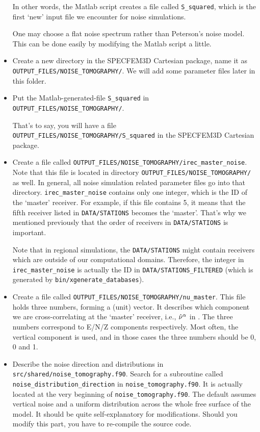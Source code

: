 \begin{itemize}
In other words, the Matlab script creates a file called \texttt{S\_squared},
which is the first `new' input file we encounter for noise simulations.


One may choose a flat noise spectrum rather than Peterson's noise
model. This can be done easily by modifying the Matlab script a little.

\item Create a new directory in the SPECFEM3D Cartesian package, name it
as \texttt{OUTPUT\_FILES/NOISE\_TOMOGRAPHY/}. We will add some parameter
files later in this folder.
\item Put the Matlab-generated-file \texttt{S\_squared} in \texttt{OUTPUT\_FILES/NOISE\_TOMOGRAPHY/}.


That's to say, you will have a file \texttt{OUTPUT\_FILES/NOISE\_TOMOGRAPHY/S\_squared}
in the SPECFEM3D Cartesian package.

\item Create a file called \texttt{OUTPUT\_FILES/NOISE\_TOMOGRAPHY/irec\_master\_noise}.
Note that this file is located in directory \texttt{OUTPUT\_FILES/NOISE\_TOMOGRAPHY/}
as well. In general, all noise simulation related parameter files
go into that directory. \texttt{irec\_master\_noise} contains only
one integer, which is the ID of the `master' receiver. For example,
if this file contains 5, it means that the fifth receiver listed in
\texttt{DATA/STATIONS} becomes the `master'. That's why we mentioned
previously that the order of receivers in \texttt{DATA/STATIONS} is
important.


Note that in regional simulations, the \texttt{DATA/STATIONS} might
contain receivers which are outside of our computational domains.
Therefore, the integer in \texttt{irec\_master\_noise} is actually
the ID in \texttt{DATA/STATIONS\_FILTERED} (which is generated by
\texttt{bin/xgenerate\_databases}).

\item Create a file called \texttt{OUTPUT\_FILES/NOISE\_TOMOGRAPHY/nu\_master}.
This file holds three numbers, forming a (unit) vector. It describes
which component we are cross-correlating at the `master' receiver,
i.e., ${\hat{{\bf \nu}}}^{\alpha}$ in \citet{trompetal2010}. The
three numbers correspond to E/N/Z components respectively. Most often,
the vertical component is used, and in those cases the three numbers
should be 0, 0 and 1.
\item Describe the noise direction and distributions in \texttt{src/shared/noise\_tomography.f90}.
Search for a subroutine called \texttt{noise\_distribution\_direction}
in \texttt{noise\_tomography.f90}. It is actually located at the very
beginning of \texttt{noise\_tomography.f90}. The default assumes vertical
noise and a uniform distribution across the whole free surface of
the model. It should be quite self-explanatory for modifications.
Should you modify this part, you have to re-compile the source code.
\end{itemize}

